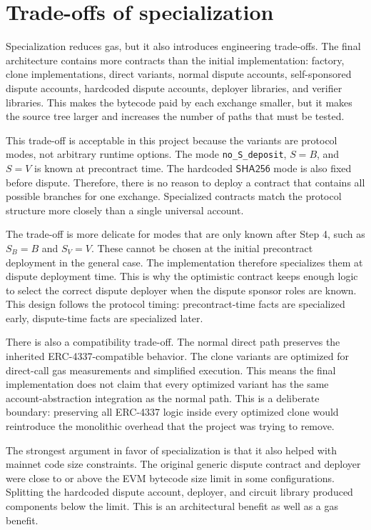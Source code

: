 \section{Trade-offs of specialization}

Specialization reduces gas, but it also introduces engineering trade-offs. The final
architecture contains more contracts than the initial implementation: factory, clone
implementations, direct variants, normal dispute accounts, self-sponsored dispute accounts,
hardcoded dispute accounts, deployer libraries, and verifier libraries. This makes the
bytecode paid by each exchange smaller, but it makes the source tree larger and increases
the number of paths that must be tested.

This trade-off is acceptable in this project because the variants are protocol modes, not
arbitrary runtime options. The mode \texttt{no\_S\_deposit}, \(S=B\), and \(S=V\) is known
at precontract time. The hardcoded \(\mathsf{SHA256}\) mode is also fixed before dispute.
Therefore, there is no reason to deploy a contract that contains all possible branches for
one exchange. Specialized contracts match the protocol structure more closely than a single
universal account.

The trade-off is more delicate for modes that are only known after Step 4, such as
\(S_B=B\) and \(S_V=V\). These cannot be chosen at the initial precontract deployment in
the general case. The implementation therefore specializes them at dispute deployment time.
This is why the optimistic contract keeps enough logic to select the correct dispute
deployer when the dispute sponsor roles are known. This design follows the protocol timing:
precontract-time facts are specialized early, dispute-time facts are specialized later.

There is also a compatibility trade-off. The normal direct path preserves the inherited
ERC-4337-compatible behavior. The clone variants are optimized for direct-call gas
measurements and simplified execution. This means the final implementation does not claim
that every optimized variant has the same account-abstraction integration as the normal
path. This is a deliberate boundary: preserving all ERC-4337 logic inside every optimized
clone would reintroduce the monolithic overhead that the project was trying to remove.

The strongest argument in favor of specialization is that it also helped with mainnet code
size constraints. The original generic dispute contract and deployer were close to or above
the EVM bytecode size limit in some configurations. Splitting the hardcoded dispute account,
deployer, and circuit library produced components below the limit. This is an architectural
benefit as well as a gas benefit.

